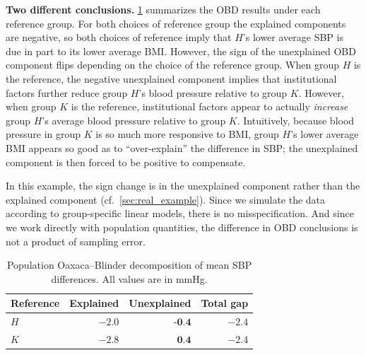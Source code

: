 \textbf{Two different conclusions.}
\cref{tab:ob_decomp} summarizes the OBD results under each reference group.
For both choices of reference group the explained components are negative, so both choices of reference imply that $H$'s lower average SBP is due in part to its lower average BMI.
However, the sign of the unexplained OBD component flips depending on the choice of the reference group.
When group $H$ is the reference, the negative unexplained component implies that institutional factors further reduce group $H$'s blood pressure relative to group $K$.
However, when group $K$ is the reference, institutional factors appear to actually \emph{increase} group $H$'s average blood pressure relative to group $K$.
Intuitively, because blood pressure in group $K$ is so much more responsive to BMI, group $H$'s lower average BMI appears so good as to ``over-explain'' the difference in SBP; the unexplained component is then forced to be positive to compensate.

In this example, the sign change is in the unexplained component rather than the explained component (cf.\ \cref{sec:real_example}). Since we simulate the data according to group-specific linear models, there is no misspecification. And since we work directly with population quantities, the difference in OBD conclusions is not a product of sampling error.

\begin{table}[H]
\caption{Population Oaxaca–Blinder decomposition of mean SBP differences. All values are in mmHg.}
\label{tab:ob_decomp}
\begin{center}
\small
\begin{tabular}{lrrr}
\toprule
Reference & Explained & Unexplained & Total gap \\
\midrule
$H$ & $-2.0$ & $\textbf{-0.4}$ & $-2.4$ \\
$K$ & $-2.8$ & $\textbf{0.4}$  & $-2.4$ \\
\bottomrule
\end{tabular}
\end{center}
\vskip -0.1in
\end{table}


